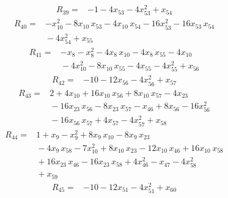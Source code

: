 \documentclass[11pt]{article}
\begin{document}
\begin{equation*}\begin{aligned}
R_{39}={}&-1 - 4x_{53} - 4x_{53}^{2} + x_{54}
\end{aligned}\end{equation*}
\begin{equation*}\begin{aligned}
R_{40}={}&-x_{10}^{2} - 8x_{10}\,x_{53} - 4x_{10}\,x_{54} - 16x_{53}^{2} - 16x_{53}\,x_{54} \\
&{} - 4x_{54}^{2} + x_{55}
\end{aligned}\end{equation*}
\begin{equation*}\begin{aligned}
R_{41}={}&-x_{8} - x_{8}^{2} - 4x_{8}\,x_{10} - 4x_{8}\,x_{55} - 4x_{10} \\
&{} - 4x_{10}^{2} - 8x_{10}\,x_{55} - 4x_{55} - 4x_{55}^{2} + x_{56}
\end{aligned}\end{equation*}
\begin{equation*}\begin{aligned}
R_{42}={}&-10 - 12x_{56} - 4x_{56}^{2} + x_{57}
\end{aligned}\end{equation*}
\begin{equation*}\begin{aligned}
R_{43}={}&2 + 4x_{10} + 16x_{10}\,x_{56} + 8x_{10}\,x_{57} - 4x_{23} \\
&{} - 16x_{23}\,x_{56} - 8x_{23}\,x_{57} - x_{46} + 8x_{56} - 16x_{56}^{2} \\
&{} - 16x_{56}\,x_{57} + 4x_{57} - 4x_{57}^{2} + x_{58}
\end{aligned}\end{equation*}
\begin{equation*}\begin{aligned}
R_{44}={}&1 + x_{9} - x_{9}^{2} + 8x_{9}\,x_{10} - 8x_{9}\,x_{23} \\
&{} - 4x_{9}\,x_{58} - 7x_{10}^{2} + 8x_{10}\,x_{23} - 12x_{10}\,x_{46} + 16x_{10}\,x_{58} \\
&{} + 16x_{23}\,x_{46} - 16x_{23}\,x_{58} + 4x_{46}^{2} - x_{47} - 4x_{58}^{2} \\
&{} + x_{59}
\end{aligned}\end{equation*}
\begin{equation*}\begin{aligned}
R_{45}={}&-10 - 12x_{51} - 4x_{51}^{2} + x_{60}
\end{aligned}\end{equation*}
\end{document}
